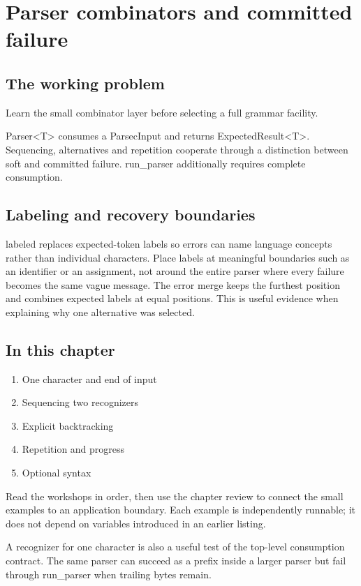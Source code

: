 \chapter{Parser combinators and committed failure}\label{ch:5}
\section*{The working problem}
Learn the small combinator layer before selecting a full grammar facility.

Parser<T> consumes a ParsecInput and returns ExpectedResult<T>. Sequencing, alternatives and repetition cooperate through a distinction between soft and committed failure. run\_parser additionally requires complete consumption.

\section*{Labeling and recovery boundaries}
labeled replaces expected-token labels so errors can name language concepts rather than individual characters. Place labels at meaningful boundaries such as an identifier or an assignment, not around the entire parser where every failure becomes the same vague message. The error merge keeps the furthest position and combines expected labels at equal positions. This is useful evidence when explaining why one alternative was selected.

\section*{In this chapter}
\begin{enumerate}
\item One character and end of input
\item Sequencing two recognizers
\item Explicit backtracking
\item Repetition and progress
\item Optional syntax
\end{enumerate}
Read the workshops in order, then use the chapter review to connect the small examples to an application boundary. Each example is independently runnable; it does not depend on variables introduced in an earlier listing.

\clearpage
{}
A recognizer for one character is also a useful test of the top-level consumption contract. The same parser can succeed as a prefix inside a larger parser but fail through run\_parser when trailing bytes remain.

